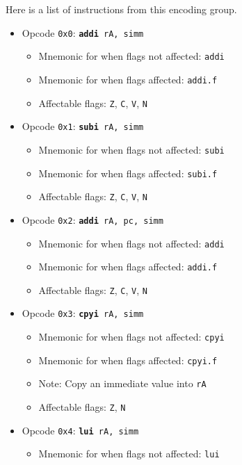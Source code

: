 \documentclass{article}
\begin{document}
	Here is a list of instructions from this encoding group.

	\singlespacing
	\begin{itemize}
		\item Opcode \texttt{0x0}:
			\texttt{\textbf{addi} rA, simm}
		\begin{itemize}
			\item Mnemonic for when flags not affected:  \texttt{addi}
			\item Mnemonic for when flags affected:  \texttt{addi.f}
			\item Affectable flags:
				\texttt{Z}, \texttt{C}, \texttt{V}, \texttt{N}
		\end{itemize}
		\item Opcode \texttt{0x1}:
			\texttt{\textbf{subi} rA, simm}
		\begin{itemize}
			\item Mnemonic for when flags not affected:  \texttt{subi}
			\item Mnemonic for when flags affected:  \texttt{subi.f}
			\item Affectable flags:
				\texttt{Z}, \texttt{C}, \texttt{V}, \texttt{N}
		\end{itemize}
		\item Opcode \texttt{0x2}:
			\texttt{\textbf{addi} rA, pc, simm}
		\begin{itemize}
			\item Mnemonic for when flags not affected:  \texttt{addi}
			\item Mnemonic for when flags affected:  \texttt{addi.f}
			\item Affectable flags:
				\texttt{Z}, \texttt{C}, \texttt{V}, \texttt{N}
		\end{itemize}
		\item Opcode \texttt{0x3}:
			\texttt{\textbf{cpyi} rA, simm}
		\begin{itemize}
			\item Mnemonic for when flags not affected:  \texttt{cpyi}
			\item Mnemonic for when flags affected:  \texttt{cpyi.f}
			\item Note:  Copy an immediate value into \texttt{rA}
			\item Affectable flags:
				\texttt{Z}, \texttt{N}
		\end{itemize}
		\item Opcode \texttt{0x4}:
			\texttt{\textbf{lui} rA, simm}
		\begin{itemize}
			\item Mnemonic for when flags not affected:  \texttt{lui}

\end{itemize}
\end{itemize}
\end{document}
